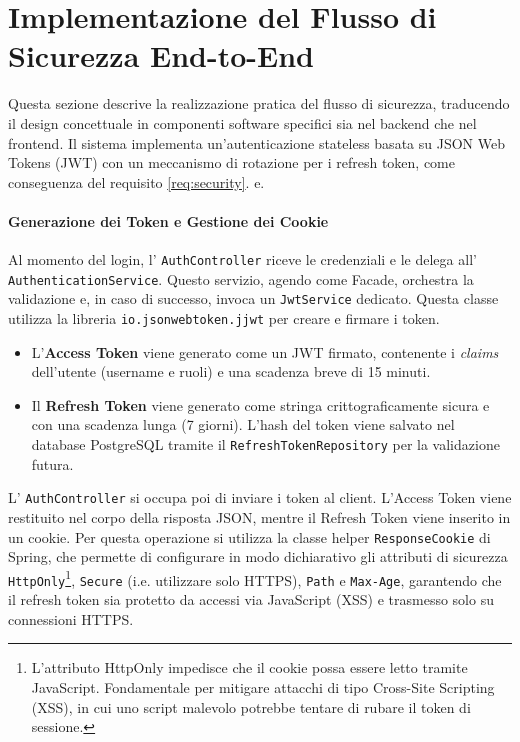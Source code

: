 \documentclass[12pt,a4paper,openright,twoside]{book}
\begin{document}
\section{Implementazione del Flusso di Sicurezza End-to-End}
\label{sec:impl_security}

Questa sezione descrive la realizzazione pratica del flusso di sicurezza, traducendo il design concettuale in componenti software specifici sia nel backend che nel frontend. Il sistema implementa un'autenticazione stateless basata su JSON Web Tokens (JWT) con un meccanismo di rotazione per i refresh token, come conseguenza del requisito \ref{req:security}.
e.

\paragraph{Generazione dei Token e Gestione dei Cookie}
Al momento del login, l' \texttt{Auth\allowbreak Controller} riceve le credenziali e le delega all' \texttt{Authentication\allowbreak Service}. Questo servizio, agendo come Facade, orchestra la validazione e, in caso di successo, invoca un \texttt{Jwt\allowbreak Service} dedicato. Questa classe utilizza la libreria \texttt{io.\allowbreak jsonwebtoken.\allowbreak jjwt} per creare e firmare i token.
\begin{itemize}
    \item L'\textbf{Access Token} viene generato come un JWT firmato, contenente i \textit{claims} dell'utente (username e ruoli) e una scadenza breve di 15 minuti.
    \item Il \textbf{Refresh Token} viene generato come stringa crittograficamente sicura e con una scadenza lunga (7 giorni). L'hash del token viene salvato nel database PostgreSQL tramite il \texttt{RefreshTokenRepository} per la validazione futura.
\end{itemize}
L' \texttt{AuthController} si occupa poi di inviare i token al client. L'Access Token viene restituito nel corpo della risposta JSON, mentre il Refresh Token viene inserito in un cookie. Per questa operazione si utilizza la classe helper \texttt{ResponseCookie} di Spring, che permette di configurare in modo dichiarativo gli attributi di sicurezza \texttt{HttpOnly}\footnote{L'attributo HttpOnly impedisce che il cookie possa essere letto tramite JavaScript. Fondamentale per mitigare attacchi di tipo Cross-Site Scripting (XSS), in cui uno script malevolo potrebbe tentare di rubare il token di sessione.}, \texttt{Secure} (i.e. utilizzare solo HTTPS), \texttt{Path} e \texttt{Max-Age}, garantendo che il refresh token sia protetto da accessi via JavaScript (XSS) e trasmesso solo su connessioni HTTPS.
\end{document}
